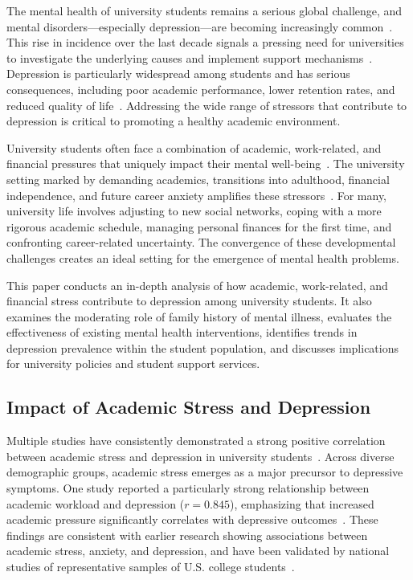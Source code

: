 \documentclass[conference]{IEEEtran}
\begin{document}
The mental health of university students remains a serious global challenge, and mental disorders—especially depression—are becoming increasingly common~\cite{b1}. This rise in incidence over the last decade signals a pressing need for universities to investigate the underlying causes and implement support mechanisms~\cite{b2}. Depression is particularly widespread among students and has serious consequences, including poor academic performance, lower retention rates, and reduced quality of life~\cite{b3}. Addressing the wide range of stressors that contribute to depression is critical to promoting a healthy academic environment.

University students often face a combination of academic, work-related, and financial pressures that uniquely impact their mental well-being~\cite{b4}. The university setting marked by demanding academics, transitions into adulthood, financial independence, and future career anxiety amplifies these stressors~\cite{b5}. For many, university life involves adjusting to new social networks, coping with a more rigorous academic schedule, managing personal finances for the first time, and confronting career-related uncertainty. The convergence of these developmental challenges creates an ideal setting for the emergence of mental health problems.

This paper conducts an in-depth analysis of how academic, work-related, and financial stress contribute to depression among university students. It also examines the moderating role of family history of mental illness, evaluates the effectiveness of existing mental health interventions, identifies trends in depression prevalence within the student population, and discusses implications for university policies and student support services.

\subsection{Impact of Academic Stress and Depression}

Multiple studies have consistently demonstrated a strong positive correlation between academic stress and depression in university students~\cite{b6}. Across diverse demographic groups, academic stress emerges as a major precursor to depressive symptoms. One study reported a particularly strong relationship between academic workload and depression ($r = 0.845$), emphasizing that increased academic pressure significantly correlates with depressive outcomes~\cite{b4}. These findings are consistent with earlier research showing associations between academic stress, anxiety, and depression, and have been validated by national studies of representative samples of U.S. college students~\cite{b6}.
\end{document}
